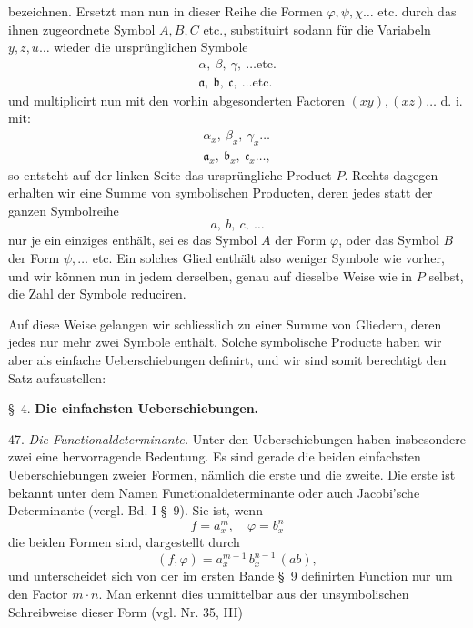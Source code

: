 bezeichnen. Ersetzt man nun in dieser Reihe die Formen $\varphi, \psi, \chi \dots$ etc. durch das ihnen zugeordnete Symbol $A, B, C$ etc., substituirt sodann für die Variabeln $y, z, u \dots$ wieder die ursprünglichen Symbole
\[
\begin{array}{c}
\alpha,\ \beta,\ \gamma,\ \dots \text{etc.} \\
\mathfrak{a},\ \mathfrak{b},\ \mathfrak{c},\ \dots \text{etc.}
\end{array}
\]
und multiplicirt nun mit den vorhin abgesonderten Factoren $(xy), (xz) \dots$ d. i. mit:
\[
\begin{array}{c}
\alpha_x,\ \beta_x,\ \gamma_x \dots \\
\mathfrak{a}_x,\ \mathfrak{b}_x,\ \mathfrak{c}_x \dots,
\end{array}
\]
so entsteht auf der linken Seite das ursprüngliche Product $P$. Rechts dagegen erhalten wir eine Summe von symbolischen Producten, deren jedes statt der ganzen Symbolreihe
\[
a,\ b,\ c,\ \dots
\]
nur je ein einziges enthält, sei es das Symbol $A$ der Form $\varphi$, oder das Symbol $B$ der Form $\psi, \dots$ etc. Ein solches Glied enthält also weniger Symbole wie vorher, und wir können nun in jedem derselben, genau auf dieselbe Weise wie in $P$ selbst, die Zahl der Symbole reduciren.

Auf diese Weise gelangen wir schliesslich zu einer Summe von Gliedern, deren jedes nur mehr zwei Symbole enthält. Solche symbolische Producte haben wir aber als einfache Ueberschiebungen definirt, und wir sind somit berechtigt den Satz aufzustellen: \glqq{}\grqq{}

\S~4. \textbf{Die einfachsten Ueberschiebungen.}

47. \textit{Die Functionaldeterminante.} Unter den Ueberschiebungen haben insbesondere zwei eine hervorragende Bedeutung. Es sind gerade die beiden einfachsten Ueberschiebungen zweier Formen, nämlich die erste und die zweite. Die erste ist bekannt unter dem Namen \glqq Functionaldeterminante\grqq{} oder auch \glqq Jacobi'sche Determinante\grqq{} (vergl. Bd. I \S~9). Sie ist, wenn
\[
f = a_x^m, \quad \varphi = b_x^n
\]
die beiden Formen sind, dargestellt durch
\[
(f, \varphi) = a_x^{m-1}\,b_x^{n-1}\,(ab),
\]
und unterscheidet sich von der im ersten Bande \S~9 definirten Function nur um den Factor $m \cdot n$. Man erkennt dies unmittelbar aus der unsymbolischen Schreibweise dieser Form (vgl. Nr. 35, III)


